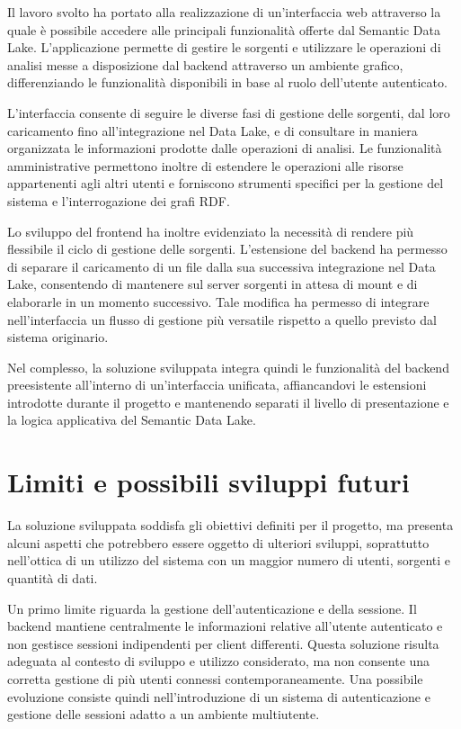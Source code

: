 \documentclass[13.6pt,a4paper]{report}
\begin{document}
Il lavoro svolto ha portato alla realizzazione di un'interfaccia web attraverso la quale è possibile accedere alle principali funzionalità offerte dal Semantic Data Lake. L'applicazione permette di gestire le sorgenti e utilizzare le operazioni di analisi messe a disposizione dal backend attraverso un ambiente grafico, differenziando le funzionalità disponibili in base al ruolo dell'utente autenticato.

\noindent
L'interfaccia consente di seguire le diverse fasi di gestione delle sorgenti, dal loro caricamento fino all'integrazione nel Data Lake, e di consultare in maniera organizzata le informazioni prodotte dalle operazioni di analisi. Le funzionalità amministrative permettono inoltre di estendere le operazioni alle risorse appartenenti agli altri utenti e forniscono strumenti specifici per la gestione del sistema e l'interrogazione dei grafi RDF.

\noindent
Lo sviluppo del frontend ha inoltre evidenziato la necessità di rendere più flessibile il ciclo di gestione delle sorgenti. L'estensione del backend ha permesso di separare il caricamento di un file dalla sua successiva integrazione nel Data Lake, consentendo di mantenere sul server sorgenti in attesa di mount e di elaborarle in un momento successivo. Tale modifica ha permesso di integrare nell'interfaccia un flusso di gestione più versatile rispetto a quello previsto dal sistema originario.

\noindent
Nel complesso, la soluzione sviluppata integra quindi le funzionalità del backend preesistente all'interno di un'interfaccia unificata, affiancandovi le estensioni introdotte durante il progetto e mantenendo separati il livello di presentazione e la logica applicativa del Semantic Data Lake.

\section{Limiti e possibili sviluppi futuri}

La soluzione sviluppata soddisfa gli obiettivi definiti per il progetto, ma presenta alcuni aspetti che potrebbero essere oggetto di ulteriori sviluppi, soprattutto nell'ottica di un utilizzo del sistema con un maggior numero di utenti, sorgenti e quantità di dati.

\noindent
Un primo limite riguarda la gestione dell'autenticazione e della sessione. Il backend mantiene centralmente le informazioni relative all'utente autenticato e non gestisce sessioni indipendenti per client differenti. Questa soluzione risulta adeguata al contesto di sviluppo e utilizzo considerato, ma non consente una corretta gestione di più utenti connessi contemporaneamente. Una possibile evoluzione consiste quindi nell'introduzione di un sistema di autenticazione e gestione delle sessioni adatto a un ambiente multiutente.
\end{document}

